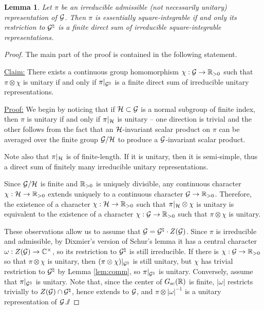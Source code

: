 \documentclass{article}
\newtheorem{lem}[thm]{Lemma}
\theoremstyle{definition}
\numberwithin{equation}{section}
\renewcommand{\-}{\hyp{}}
\begin{document}
\begin{lem} \label{lem:eds-equiv}
  Let $\pi$ be an irreducible admissible (not necessarily unitary) representation of $\mathcal{G}$.
  Then $\pi$ is essentially square-integrable if and only its restriction to $\mathcal{G}^\natural$ is a finite direct sum of irreducible square-integrable representations.
\end{lem}
\begin{proof}
The main part of the proof is contained in the following statement.

\ul{Claim:} There exists a continuous group homomorphism $\chi : \mathcal{G} \to \mathbb{R}_{>0}$ such that $\pi\otimes\chi$ is unitary if and only if $\pi|_{\mathcal{G}^{\natural}}$ is a finite direct sum of irreducible unitary representations.

\ul{Proof:} We begin by noticing that if $\mathcal{H} \subset \mathcal{G}$ is a normal subgroup of finite index, then $\pi$ is unitary if and only if $\pi|_{\mathcal{H}}$ is unitary -- one direction is trivial and the other follows from the fact that an $\mathcal{H}$-invariant scalar product on $\pi$ can be averaged over the finite group $\mathcal{G}/\mathcal{H}$ to produce a $\mathcal{G}$-invariant scalar product. 

Note also that $\pi|_{\mathcal{H}}$ is of finite-length. If it is unitary, then it is semi-simple, thus a direct sum of finitely many irreducible unitary representations.

Since $\mathcal{G}/\mathcal{H}$ is finite and $\mathbb{R}_{>0}$ is uniquely divisible, any continuous character $\chi : \mathcal{H} \to \mathbb{R}_{>0}$ extends uniquely to a continuous character $\mathcal{G} \to \mathbb{R}_{>0}$. Therefore, the existence of a character $\chi : \mathcal{H} \to \mathbb{R}_{>0}$ such that $\pi|_{\mathcal{H}} \otimes \chi$ is unitary is equivalent to the existence of a character $\chi : \mathcal{G} \to \mathbb{R}_{>0}$ such that $\pi \otimes \chi$ is unitary.

These observations allow us to assume that $\mathcal{G}=\mathcal{G}^\natural \cdot Z(\mathcal{G})$. Since $\pi$ is irreducible and admissible, by Dixmier's version of Schur's lemma
\cite[Lemma N]{wallach}
it has a central character
$\omega : Z(\mathcal{G}) \to \mathbb{C}^\times$, so its restriction to $\mathcal{G}^\natural$ is still irreducible. If there is $\chi : \mathcal{G} \to \mathbb{R}_{>0}$ so that $\pi \otimes \chi$ is unitary, then $(\pi\otimes\chi)|_{\mathcal{G}^\natural}$ is still unitary, but $\chi$ has trivial restriction to $\mathcal{G}^\natural$ by Lemma \ref{lem:comm}, so $\pi|_{\mathcal{G}^\natural}$ is unitary. Conversely, assume that $\pi|_{\mathcal{G}^\natural}$ is unitary. Note that, since the center of $G_{\textrm{sc}}(\mathbb{R})$ is finite, $|\omega|$ restricts trivially to $Z(\mathcal{G}) \cap \mathcal{G}^\natural$, hence extends to $\mathcal{G}$, and $\pi\otimes|\omega|^{-1}$ is a unitary representation of $\mathcal{G}$.\hfill $\sslash$


\end{proof}
\end{document}
